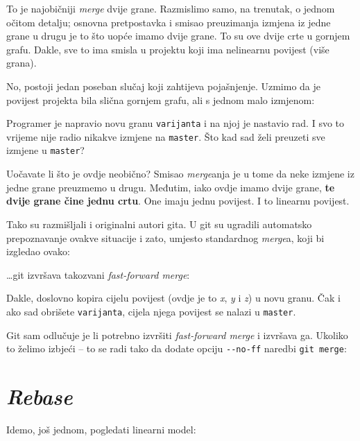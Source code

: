 

To je najobičniji \emph{merge} dvije grane.
Razmislimo samo, na trenutak, o jednom očitom detalju;
osnovna pretpostavka i smisao preuzimanja izmjena iz jedne grane u drugu je to što uopće imamo dvije grane.
To su ove dvije crte u gornjem grafu.
Dakle, sve to ima smisla u projektu koji ima nelinearnu povijest (više grana).

No, postoji jedan poseban slučaj koji zahtijeva pojašnjenje.
Uzmimo da je povijest projekta bila slična gornjem grafu, ali s jednom malo izmjenom:



Programer je napravio novu granu \verb+varijanta+ i na njoj je nastavio rad.
I svo to vrijeme nije radio nikakve izmjene na \verb+master+.
Što kad sad želi preuzeti sve izmjene u \verb+master+?

Uočavate li što je ovdje neobično?
Smisao \emph{merge}anja je u tome da neke izmjene iz jedne grane preuzmemo u drugu.
Međutim, iako ovdje imamo dvije grane, \textbf{te dvije grane čine jednu crtu}. 
One imaju jednu povijest. 
I to linearnu povijest.

Tako su razmišljali i originalni autori gita.
U git su ugradili automatsko prepoznavanje ovakve situacije i zato, umjesto standardnog \emph{merge}a, koji bi izgledao ovako:



\dots{}git izvršava takozvani \emph{fast-forward merge}:



Dakle, doslovno kopira cijelu povijest (ovdje je to \emph x, \emph y i \emph z) u novu granu.
Čak i ako sad obrišete \verb+varijanta+, cijela njega povijest se nalazi u \verb+master+.

Git sam odlučuje je li potrebno izvršiti \emph{fast-forward merge} i izvršava ga. Ukoliko to želimo izbjeći -- to se radi tako da dodate opciju \verb+--no-ff+ naredbi \verb+git merge+:


\section*{\emph{Rebase}}

Idemo, još jednom, pogledati linearni model:



